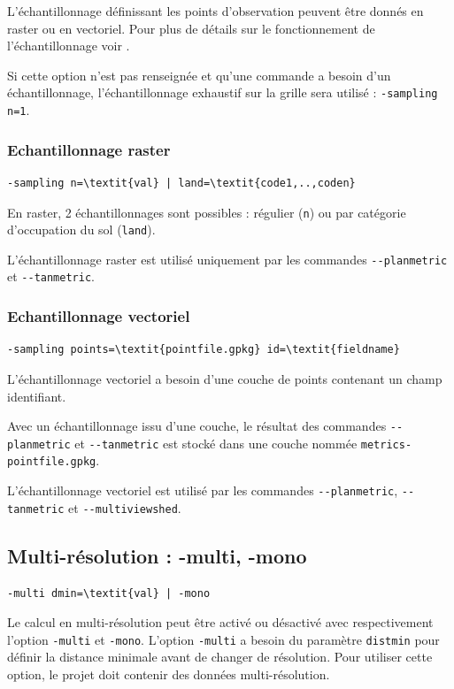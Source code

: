 \documentclass{report}
\begin{document}
L'échantillonnage définissant les points d'observation peuvent être donnés en raster ou en vectoriel. Pour plus de détails sur le fonctionnement de l'échantillonnage voir .

Si cette option n'est pas renseignée et qu'une commande a besoin d'un échantillonnage, l'échantillonnage exhaustif sur la grille sera utilisé : \verb|-sampling n=1|.

\subsubsection{Echantillonnage raster}
\begin{Verbatim}[commandchars=\\\{\}]
-sampling n=\textit{val} | land=\textit{code1,..,coden}
\end{Verbatim}
En raster, 2 échantillonnages sont possibles : régulier (\verb|n|) ou par catégorie d'occupation du sol (\verb|land|).

L'échantillonnage raster est utilisé uniquement par les commandes \verb|--planmetric| et  \verb|--tanmetric|.

\subsubsection{Echantillonnage vectoriel}
\begin{Verbatim}[commandchars=\\\{\}]
-sampling points=\textit{pointfile.gpkg} id=\textit{fieldname}
\end{Verbatim}
L'échantillonnage vectoriel a besoin d'une couche de points contenant un champ identifiant.

Avec un échantillonnage issu d'une couche, le résultat des commandes \verb|--planmetric| et \verb|--tanmetric| est stocké dans une couche nommée \verb|metrics-pointfile.gpkg|.

L'échantillonnage vectoriel est utilisé par les commandes \verb|--planmetric|,  \verb|--tanmetric| et \verb|--multiviewshed|.


\subsection{Multi-résolution : -multi, -mono}
\begin{Verbatim}[commandchars=\\\{\}]
-multi dmin=\textit{val} | -mono
\end{Verbatim}

Le calcul en multi-résolution peut être activé ou désactivé avec respectivement l'option \verb|-multi| et \verb|-mono|. 
L'option \verb|-multi| a besoin du paramètre \verb|distmin| pour définir la distance minimale avant de changer de résolution. Pour utiliser cette option, le projet doit contenir des données multi-résolution. 
\end{document}
